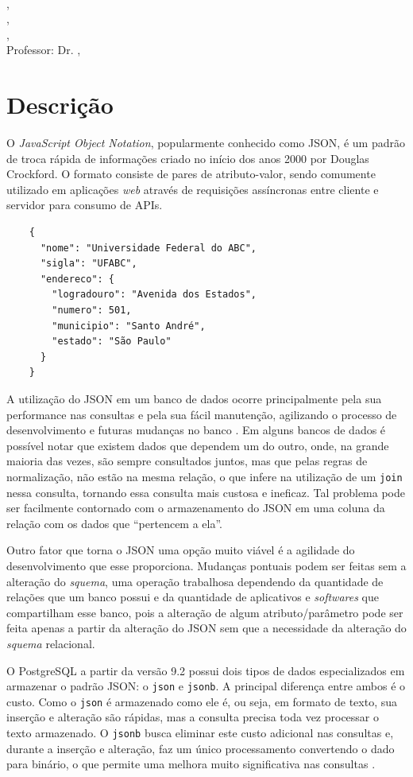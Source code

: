 \documentclass[a4paper, 12pt]{article}
\title{\titulo}
\author{\nomeAutorUm \and \nomeAutorDois}
\date{\today}
\makeatletter
\newcommand{\printtitle}{
  \begin{center}
    {\Large \scshape \titulo}\\[1em]
    {\nomeAutorUm, \raAutorUm}\\
    {\nomeAutorDois, \raAutorDois}\\
    {\nomeAutorTres, \raAutorTres}\\[1em]
    Professor: Dr\@. \nomeProfessor, \centroProfessor\\ 
    {\itshape \campusFaculdade}
  \end{center}
}
\makeatother
\begin{document}
  \printtitle

  \section{Descrição}

  O \emph{JavaScript Object Notation}, popularmente conhecido
  como JSON, é um padrão de troca rápida de informações
  criado no início dos anos 2000 por Douglas Crockford.
  O formato consiste de pares de atributo-valor, sendo
  comumente utilizado em aplicações \emph{web} através
  de requisições assíncronas entre cliente e servidor
  para consumo de APIs.
  
  \begin{verbatim}
    {
      "nome": "Universidade Federal do ABC",
      "sigla": "UFABC",
      "endereco": {
        "logradouro": "Avenida dos Estados",
        "numero": 501,
        "municipio": "Santo André",
        "estado": "São Paulo"
      }
    }
  \end{verbatim}
  
  A utilização do JSON em um banco de dados ocorre
  principalmente pela sua performance nas consultas e 
  pela sua fácil manutenção, agilizando o processo de
  desenvolvimento e futuras mudanças no banco \cite{smith16}.
  Em alguns bancos de dados é possível notar que existem 
  dados que dependem um do outro, onde, na grande maioria 
  das vezes, são sempre consultados juntos, mas que pelas 
  regras de normalização, não estão na mesma relação, o 
  que infere na utilização de um \verb|join| nessa consulta, 
  tornando essa consulta mais custosa e ineficaz. Tal problema
  pode ser facilmente contornado com o armazenamento 
  do JSON em uma coluna da relação com os dados que 
  ``pertencem a ela''.
  
  Outro fator que torna o JSON uma opção muito viável é
  a agilidade do desenvolvimento que esse proporciona.
  Mudanças pontuais podem ser feitas sem a alteração do 
  \emph{squema}, uma operação trabalhosa dependendo
  da quantidade de relações que um banco possui e da
  quantidade de aplicativos e \emph{softwares} que 
  compartilham esse banco, pois a alteração de algum
  atributo/parâmetro pode ser feita apenas a partir 
  da alteração do JSON sem que a necessidade da 
  alteração do \emph{squema} relacional.
  
  O PostgreSQL a partir da versão 9.2 \cite{halliday2018}
  possui dois tipos de dados especializados em 
  armazenar o padrão JSON: o \verb|json| e \verb|jsonb|.
  A principal diferença entre ambos é o custo. 
  Como o \verb|json| é armazenado como ele é, ou seja, 
  em formato de texto, sua inserção e alteração são 
  rápidas, mas a consulta precisa toda vez processar
  o texto armazenado. O \verb|jsonb| busca eliminar
  este custo adicional nas consultas e, durante
  a inserção e alteração, faz um único processamento
  convertendo o dado para binário, o que permite
  uma melhora muito significativa nas consultas
  \cite{pddatatypejson}.
  
\end{document}
